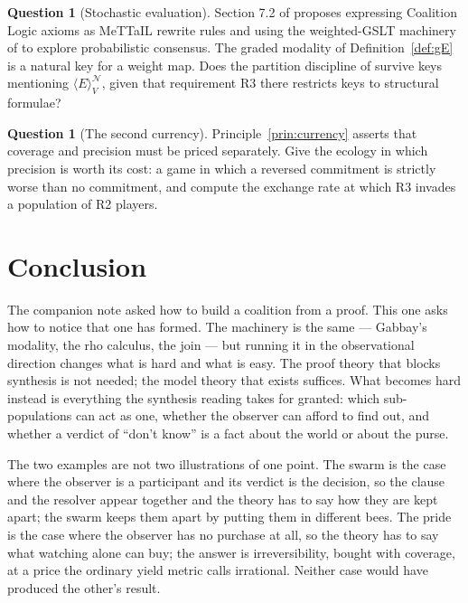 \documentclass[11pt,a4paper]{article}
\theoremstyle{plain}
\theoremstyle{definition}
\newtheorem{question}[theorem]{Question}
\theoremstyle{remark}
\newcommand{\gE}[2]{\langle E\rangle^{#1}_{#2}}
\newcommand{\Nsp}{\mathcal{N}}
\newcommand{\Val}{V}
\begin{document}
\begin{question}[Stochastic evaluation]
Section 7.2 of \cite{consensus} proposes expressing Coalition Logic axioms as
MeTTaIL rewrite rules and using the weighted-GSLT machinery of \cite{weighted}
to explore probabilistic consensus. The graded modality of
Definition~\ref{def:gE} is a natural key for a weight map. Does the partition
discipline of \cite[\S3]{weighted} survive keys mentioning $\gE{\Nsp}{\Val}$,
given that requirement R3 there restricts keys to structural formulae?
\end{question}

\begin{question}[The second currency]
Principle~\ref{prin:currency} asserts that coverage and precision must be
priced separately. Give the ecology in which precision is worth its cost: a
game in which a reversed commitment is strictly worse than no commitment, and
compute the exchange rate at which R3 invades a population of R2 players.
\end{question}

\section{Conclusion}

The companion note asked how to build a coalition from a proof. This one asks
how to notice that one has formed. The machinery is the same --- Gabbay's
modality, the rho calculus, the join --- but running it in the observational
direction changes what is hard and what is easy. The proof theory that blocks
synthesis is not needed; the model theory that exists suffices. What becomes
hard instead is everything the synthesis reading takes for granted: which
sub-populations can act as one, whether the observer can afford to find out, and
whether a verdict of ``don't know'' is a fact about the world or about the
purse.

The two examples are not two illustrations of one point. The swarm is the case
where the observer is a participant and its verdict is the decision, so the
clause and the resolver appear together and the theory has to say how they are
kept apart; the swarm keeps them apart by putting them in different bees. The
pride is the case where the observer has no purchase at all, so the theory has
to say what watching alone can buy; the answer is irreversibility, bought with
coverage, at a price the ordinary yield metric calls irrational. Neither case
would have produced the other's result.
\end{document}
